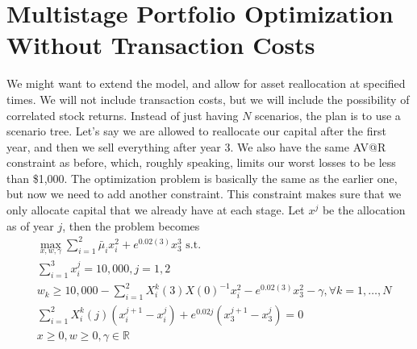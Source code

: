 \documentclass{amsart}
\theoremstyle{definition}
\theoremstyle{remark}
\begin{document}
\section{Multistage Portfolio Optimization Without Transaction Costs}
We might want to extend the model, and allow for asset reallocation at specified times. We will not include transaction costs, but we will include the possibility of correlated stock returns. Instead of just having $N$ scenarios, the plan is to use a scenario tree. Let's say we are allowed to reallocate our capital after the first year, and then we sell everything after year 3. We also have the same AV@R constraint as before, which, roughly speaking, limits our worst losses to be less than \$1,000.  The optimization problem is basically the same as the earlier one, but now we need to add another constraint. This constraint makes sure that we only allocate capital that we already have at each stage. Let $x^j$ be the allocation as of year $j$, then the problem becomes
\begin{align*}
&\max_{x,w,\gamma} \sum_{i=1}^2 \bar{\mu}_i x^2_i +  e^{0.02(3)} x_3^3 \text{ s.t.}\\
&\sum_{i=1}^3 x_i^j = 10,000, j=1,2\\
& w_k \ge 10,000 - \sum_{i=1}^2 X_i^k(3) X(0)^{-1} x^2_i - e^{0.02(3)} x_3^2 - \gamma, \forall k = 1,\ldots, N\\
&\sum_{i=1}^2 X_i^k(j) (x_i^{j+1}-x_i^j) + e^{0.02j}(x_3^{j+1}-x_3^j) = 0\\
&x \ge 0, w \ge 0, \gamma \in \mathbb{R}
\end{align*}
\end{document}

